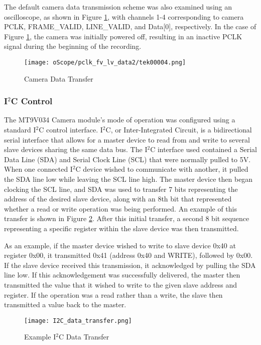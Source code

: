 \par
The default camera data transmission scheme was also examined using an oscilloscope, as shown in Figure \ref{camDataTransfer}, with channels 1-4 corresponding to camera PCLK, FRAME\_VALID, LINE\_VALID, and Data[0], respectively. In the case of Figure \ref{camDataTransfer}, the camera was initially powered off, resulting in an inactive PCLK signal during the beginning of the recording.
\begin{figure}[H]
	\centerline{\texttt{[image: oScope/pclk\_fv\_lv\_data2/tek00004.png]}}
	\caption{Camera Data Transfer}
	\label{camDataTransfer}
\end{figure}

\subsubsection{I$^2$C Control} \label{cameraI2Cdescription}
The MT9V034 Camera module's mode of operation was configured using a standard I$^2$C control interface. I$^2$C, or Inter-Integrated Circuit, is a bidirectional serial interface that allows for a master device to read from and write to several slave devices sharing the same data bus. The I$^2$C interface used contained a Serial Data Line (SDA) and Serial Clock Line (SCL) that were normally pulled to 5V. When one connected I$^2$C device wished to communicate with another, it pulled the SDA line low while leaving the SCL line high. The master device then began clocking the SCL line, and SDA was used to transfer 7 bits representing the address of the desired slave device, along with an 8th bit that represented whether a read or write operation was being performed. An example of this transfer is shown in Figure \ref{I2Cexample}. After this initial transfer, a second 8 bit sequence representing a specific register within the slave device was then transmitted. 
\par
As an example, if the master device wished to write to slave device 0x40 at register 0x00, it transmitted 0x41 (address 0x40 and WRITE), followed by 0x00. If the slave device received this transmission, it acknowledged by pulling the SDA line low. If this acknowledgement was successfully delivered, the master then transmitted the value that it wished to write to the given slave address and register. If the operation was a read rather than a write, the slave then transmitted a value back to the master.  
\par
\begin{figure}[H]
	\centerline{\texttt{[image: I2C\_data\_transfer.png]}}
	\caption{Example I$^2$C Data Transfer}
	\label{I2Cexample}
\end{figure}

